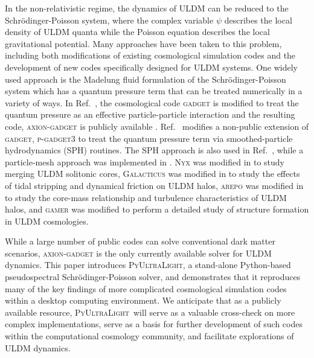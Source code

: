 \documentclass[a4paper,11pt]{article}
\newcommand{\PyUltraLight}{\textsc{PyUltraLight}\xspace}
\begin{document}
In the non-relativistic regime, the dynamics of ULDM can be reduced to the Schr{\"o}dinger-Poisson  system, where the complex variable $\psi$ describes the local density of ULDM quanta while the Poisson equation describes the local gravitational potential. Many approaches have been taken to this problem, including both modifications of existing cosmological simulation codes and the development of new codes specifically designed for ULDM systems. One widely used approach is the Madelung fluid formulation of the Schr{\"o}dinger-Poisson system \cite{Madelung1926} which has a quantum pressure term that can be treated numerically in a variety of ways. In Ref.~\cite{Zhang:2016uiy}, the cosmological code \textsc{gadget} \cite{Springel:2005mi} is modified to treat the quantum pressure as an effective particle-particle interaction and the resulting code, \textsc{axion-gadget} is publicly available \cite{axion-gadget}.  Ref.~\cite{Nori:2018hud} modifies a non-public extension of \textsc{gadget}, \textsc{p-gadget3} to treat the quantum pressure term via smoothed-particle hydrodynamics (SPH) routines. The SPH approach is also  used in Ref.~\cite{Mocz:2015sda}, while a particle-mesh approach was implemented in \cite{Veltmaat:2016rxo}. N\textsc{yx} \cite{Almgren:2013sz} was modified in \cite{Schwabe:2016rze} to study merging ULDM solitonic cores, G\textsc{alacticus} \cite{Benson:2010kx} was modified in \cite{Du:2016zcv} to study the effects of tidal stripping and dynamical friction on ULDM halos, \textsc{arepo} \cite{Springel:2009aa} was modified in \cite{Mocz:2017wlg} to study the core-mass relationship and turbulence characteristics of ULDM halos, and \textsc{gamer} \cite{Schive:2009hw, gamer} was modified \cite{Schive:2014dra} to perform a detailed study of structure formation in ULDM cosmologies. 

While a large number of public codes can solve conventional dark matter scenarios, \textsc{axion-gadget} is the only currently available solver for ULDM dynamics. This paper introduces \PyUltraLight, a stand-alone Python-based pseudospectral Schr{\"o}dinger-Poisson solver, and  demonstrates that it reproduces many of the key findings of more complicated cosmological simulation codes within a desktop computing environment. We anticipate that as a publicly available resource, \PyUltraLight\ will serve as a valuable cross-check on more complex implementations, serve as a basis for further development of such codes within the computational cosmology community, and facilitate explorations of ULDM dynamics.   
\end{document}
